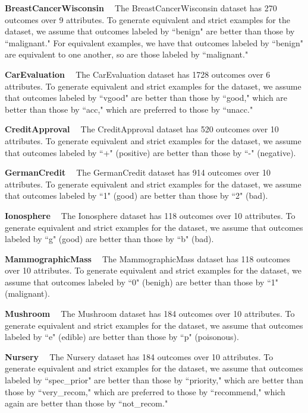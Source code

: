 
\smallskip \noindent \textbf{BreastCancerWisconsin \ }
The BreastCancerWisconsin dataset has 270 outcomes over 9 attributes.
To generate equivalent and strict examples for the dataset,
we assume that outcomes labeled by ``benign" are better than
those by ``malignant."
For equivalent examples, we have that outcomes labeled by ``benign" are equivalent
to one another, so are those labeled by ``malignant."

\smallskip \noindent \textbf{CarEvaluation \ }
The CarEvaluation dataset has 1728 outcomes over 6 attributes.
To generate equivalent and strict examples for the dataset,
we assume that outcomes labeled by ``vgood" are better than
those by ``good," which are better than those
by ``acc," which are preferred to those by ``unacc."

\smallskip \noindent \textbf{CreditApproval \ }
The CreditApproval dataset has 520 outcomes over 10 attributes.
To generate equivalent and strict examples for the dataset,
we assume that outcomes labeled by ``+" (positive) are better than
those by ``-" (negative).

\smallskip \noindent \textbf{GermanCredit \ }
The GermanCredit dataset has 914 outcomes over 10 attributes.
To generate equivalent and strict examples for the dataset,
we assume that outcomes labeled by ``1" (good) are better than
those by ``2" (bad).

\smallskip \noindent \textbf{Ionosphere \ }
The Ionosphere dataset has 118 outcomes over 10 attributes.
To generate equivalent and strict examples for the dataset,
we assume that outcomes labeled by ``g" (good) are better than
those by ``b" (bad).

\smallskip \noindent \textbf{MammographicMass \ }
The MammographicMass dataset has 118 outcomes over 10 attributes.
To generate equivalent and strict examples for the dataset,
we assume that outcomes labeled by ``0" (benigh) are better than
those by ``1" (malignant).

\smallskip \noindent \textbf{Mushroom \ }
The Mushroom dataset has 184 outcomes over 10 attributes.
To generate equivalent and strict examples for the dataset,
we assume that outcomes labeled by ``e" (edible) are better than
those by ``p" (poisonous).

\smallskip \noindent \textbf{Nursery \ }
The Nursery dataset has 184 outcomes over 10 attributes.
To generate equivalent and strict examples for the dataset,
we assume that outcomes labeled by ``spec\_prior" are better than
those by ``priority," which are better than those
by ``very\_recom," which are preferred to those by ``recommend,"
which again are better than those by ``not\_recom."

